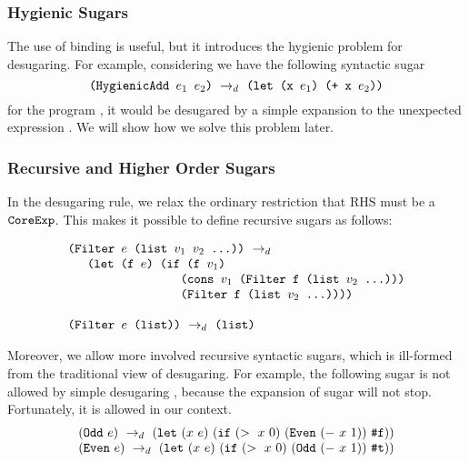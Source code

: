 \subsubsection{Hygienic Sugars}
The use of  binding is useful, but it introduces the hygienic problem for desugaring. For example, considering we have the following syntactic sugar
\[
\texttt{(HygienicAdd $e_1$ $e_2$)} ~\rightarrow_d~ \texttt{(let (x $e_1$) (+ x $e_2$))}
\]
for the program , it would be desugared by a simple expansion to the unexpected expression . We will show how we solve this problem later.

\subsubsection{Recursive and Higher Order Sugars}
In the desugaring rule, we relax the ordinary restriction that RHS must be a $\mbox{\tt CoreExp}$. This makes it possible to define recursive sugars as follows:

\[\begin{array}{l}
	\texttt{(Filter $e$ (list $v_1$ $v_2$ ...))} ~\rightarrow_d~\\
	\quad
	\texttt{ (let (f $e$) (if (f $v_1$)}\\
	\qquad\qquad\qquad\qquad\ \texttt{ (cons $v_1$ (Filter f (list $v_2$ ...)))}\\
	\qquad\qquad\qquad\qquad\ \texttt{ (Filter f (list $v_2$ ...))))}\\
\\
	\texttt{(Filter $e$ (list))} ~\rightarrow_d~ \texttt{(list)}
	\end{array}
\]

Moreover, we allow more involved recursive syntactic sugars, which is ill-formed from the traditional view of desugaring. For example, the following sugar is not allowed by simple desugaring \cite{resugaring}, because the expansion of sugar will not stop. Fortunately, it is allowed in our context.
\[
\begin{array}{l}
(\mbox{\tt Odd}~e) ~\rightarrow_d~ (\mbox{\tt let}~(x~e)~(\mbox{\tt if}~(>~x~0)~(\mbox{\tt Even}~(-~x~1))~\mbox{\tt \#f}))\\
(\mbox{\tt Even}~e) ~\rightarrow_d~ (\mbox{\tt let}~(x~e)~(\mbox{\tt if}~(>~x~0)~(\mbox{\tt Odd}~(-~x~1))~\mbox{\tt \#t}))
\end{array}
\]

